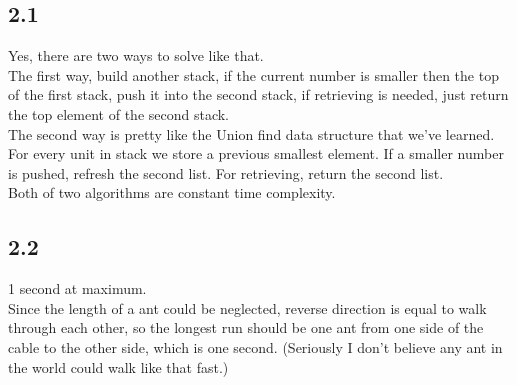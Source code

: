\documentclass{article}
\begin{document}
\subsection*{2.1}
Yes, there are two ways to solve like that.
\\The first way, build another stack, if the current number is smaller then the top of the first stack, push it into the second stack, if retrieving is needed, just return the top element of the second stack.
\\The second way is pretty like the Union find data structure that we've learned. For every unit in stack we store a previous smallest element. If a smaller number is pushed, refresh the second list. For retrieving, return the second list.
\\Both of two algorithms are constant time complexity.
\subsection*{2.2}
1 second at maximum.\\
Since the length of a ant could be neglected, reverse direction is equal to walk through each other, so the longest run should be one ant from one side of the cable to the other side, which is one second.
(Seriously I don't believe any ant in the world could walk like that fast.)
\end{document}
